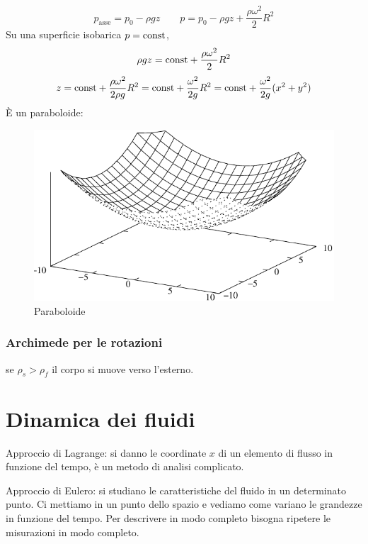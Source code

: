 \begin{equation*}p_\text{asse}=p_0-\rho gz\qquad p=p_0-\rho gz+\frac{\rho\omega^2}{2}R^2\end{equation*}
Su una superficie isobarica $p=\text{const}$,
\begin{equation*}\rho gz=\text{const}+\frac{\rho\omega^2}{2}R^2\end{equation*}
\begin{equation*}z=\text{const}+\frac{\rho\omega^2}{2\rho g}R^2=\text{const}+\frac{\omega^2}{2g}R^2=\text{const}+\frac{\omega^2}{2g}(x^2+y^2)\end{equation*}
\`E un paraboloide:
\begin{figure}[htbp]
\centering
\includegraphics[scale=1]{immagini/fisica1/paraboloide}
\caption{Paraboloide}
\end{figure}
\subsubsection{Archimede per le rotazioni}
se $\rho_s>\rho_f$ il corpo si muove verso l'esterno.


\section{Dinamica dei fluidi}

Approccio di Lagrange: si danno le coordinate $x$ di un elemento di flusso in funzione del tempo, è un metodo di analisi complicato.

Approccio di Eulero: si studiano le caratteristiche del fluido in un determinato punto. Ci mettiamo in un punto dello spazio e vediamo come variano le grandezze in funzione del tempo. Per descrivere in modo completo bisogna ripetere le misurazioni in modo completo.

